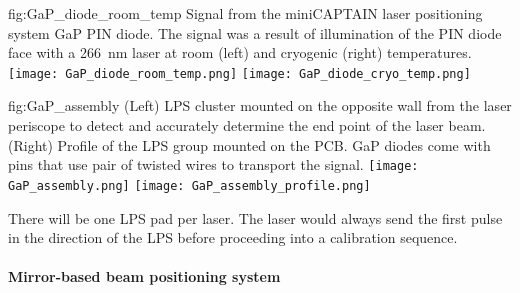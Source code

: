 

\begin{dunefigure}{fig:GaP_diode_room_temp}
{Signal from the miniCAPTAIN laser positioning system GaP PIN diode. The signal was a result of illumination of the PIN diode face with a \SI{266}{\nano\m} laser at room (left) and cryogenic (right) temperatures.}
\texttt{[image: GaP\_diode\_room\_temp.png]} 
\texttt{[image: GaP\_diode\_cryo\_temp.png]} 
\end{dunefigure}



\begin{dunefigure}{fig:GaP_assembly}
{(Left) LPS cluster mounted on the opposite wall from the laser periscope to detect and accurately determine the end point of the laser beam. (Right)
Profile of the LPS group mounted on the PCB. GaP diodes come with pins that use pair of twisted wires to transport the signal.
}
\texttt{[image: GaP\_assembly.png]} 
\texttt{[image: GaP\_assembly\_profile.png]} 
\end{dunefigure}


There will be one LPS pad per laser. The laser would always send the first pulse in the direction of the LPS before proceeding into a calibration sequence. 


\paragraph{Mirror-based beam positioning system}

